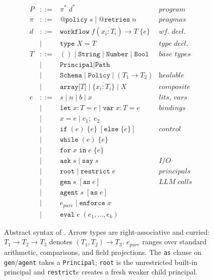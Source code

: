 \begin{figure}[t]
\small
\setlength{\arraycolsep}{3pt}
\[\begin{array}{rcll}
P & ::= & \pi^*\; d^* & \textit{program} \\[2pt]
\pi & ::= & \texttt{@policy}\; s \mid \texttt{@retries}\; n & \textit{pragmas} \\[2pt]
d & ::= & \texttt{workflow}\; f(\overline{x_i{:}T_i}) \to T\; \{e\} & \textit{wf.\ decl.} \\
  & \mid & \texttt{type}\; X = T & \textit{type decl.} \\[2pt]
T & ::= & () \mid \texttt{String} \mid \texttt{Number} \mid \texttt{Bool} & \textit{base types} \\
  & \mid & \texttt{Principal} \mid \texttt{Path} & \\
  & \mid & \texttt{Schema} \mid \texttt{Policy} \mid (T_1 \to T_2) & \textit{healable} \\
  & \mid & \texttt{array[}T\texttt{]} \mid \{ \overline{x_i{:}T_i} \} \mid X & \textit{composite} \\[2pt]
e & ::= & s \mid n \mid b \mid x & \textit{lits, vars} \\
  & \mid & \texttt{let}\; x {:} T = e \mid \texttt{var}\; x {:} T = e & \textit{bindings} \\
  & \mid & x = e \mid e_1 ;\; e_2 & \\
  & \mid & \texttt{if}\; (e)\; \{e\}\; [\texttt{else}\; \{e\}] & \textit{control} \\
  & \mid & \texttt{while}\; (e)\; \{e\} & \\
  & \mid & \texttt{for}\; x\; \texttt{in}\; e\; \{e\} & \\
  & \mid & \texttt{ask}\; s \mid \texttt{say}\; s & \textit{I/O} \\
  & \mid & \texttt{root} \mid \texttt{restrict}\; e & \textit{principals} \\
  & \mid & \texttt{gen}\; s\; [\texttt{as}\; e] & \textit{LLM calls} \\
  & \mid & \texttt{agent}\; s\; [\texttt{as}\; e] & \\
  & \mid & e_{\mathit{pure}} \mid \texttt{enforce}\; x & \\
  & \mid & \texttt{eval}\; e\;(e_1, \ldots, e_k) &
\end{array}\]
\caption{Abstract syntax of \pact. Arrow types are right-associative and curried: $T_1 \to T_2 \to T_3$ denotes $(T_1, T_2) \to T_3$. $e_{\mathit{pure}}$ ranges over standard arithmetic, comparisons, and field projections. The \texttt{as} clause on \texttt{gen}/\allowbreak\texttt{agent} takes a \texttt{Principal}; \texttt{root} is the unrestricted built-in principal and \texttt{restrict}\;$e$ creates a fresh weaker child principal.}
\label{fig:syntax}
\end{figure}
